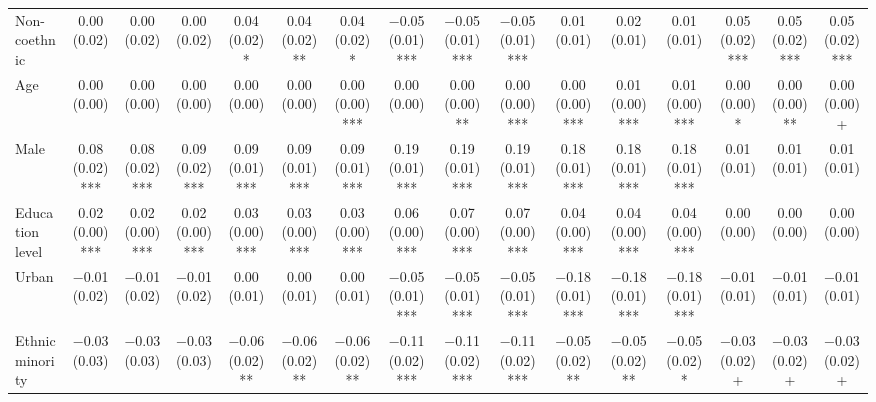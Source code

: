 \begin{table}
\begin{tabular}[t]{lccccccccccccccc}
Non-coethnic & \num{0.00} (\num{0.02}) & \num{0.00} (\num{0.02}) & \num{0.00} (\num{0.02}) & \num{0.04} (\num{0.02})* & \num{0.04} (\num{0.02})** & \num{0.04} (\num{0.02})* & \num{-0.05} (\num{0.01})*** & \num{-0.05} (\num{0.01})*** & \num{-0.05} (\num{0.01})*** & \num{0.01} (\num{0.01}) & \num{0.02} (\num{0.01}) & \num{0.01} (\num{0.01}) & \num{0.05} (\num{0.02})*** & \num{0.05} (\num{0.02})*** & \num{0.05} (\num{0.02})***\\
Age & \num{0.00} (\num{0.00}) & \num{0.00} (\num{0.00}) & \num{0.00} (\num{0.00}) & \num{0.00} (\num{0.00}) & \num{0.00} (\num{0.00}) & \num{0.00} (\num{0.00})*** & \num{0.00} (\num{0.00}) & \num{0.00} (\num{0.00})** & \num{0.00} (\num{0.00})*** & \num{0.00} (\num{0.00})*** & \num{0.01} (\num{0.00})*** & \num{0.01} (\num{0.00})*** & \num{0.00} (\num{0.00})* & \num{0.00} (\num{0.00})** & \num{0.00} (\num{0.00})+\\
Male & \num{0.08} (\num{0.02})*** & \num{0.08} (\num{0.02})*** & \num{0.09} (\num{0.02})*** & \num{0.09} (\num{0.01})*** & \num{0.09} (\num{0.01})*** & \num{0.09} (\num{0.01})*** & \num{0.19} (\num{0.01})*** & \num{0.19} (\num{0.01})*** & \num{0.19} (\num{0.01})*** & \num{0.18} (\num{0.01})*** & \num{0.18} (\num{0.01})*** & \num{0.18} (\num{0.01})*** & \num{0.01} (\num{0.01}) & \num{0.01} (\num{0.01}) & \num{0.01} (\num{0.01})\\
Education level & \num{0.02} (\num{0.00})*** & \num{0.02} (\num{0.00})*** & \num{0.02} (\num{0.00})*** & \num{0.03} (\num{0.00})*** & \num{0.03} (\num{0.00})*** & \num{0.03} (\num{0.00})*** & \num{0.06} (\num{0.00})*** & \num{0.07} (\num{0.00})*** & \num{0.07} (\num{0.00})*** & \num{0.04} (\num{0.00})*** & \num{0.04} (\num{0.00})*** & \num{0.04} (\num{0.00})*** & \num{0.00} (\num{0.00}) & \num{0.00} (\num{0.00}) & \num{0.00} (\num{0.00})\\
Urban & \num{-0.01} (\num{0.02}) & \num{-0.01} (\num{0.02}) & \num{-0.01} (\num{0.02}) & \num{0.00} (\num{0.01}) & \num{0.00} (\num{0.01}) & \num{0.00} (\num{0.01}) & \num{-0.05} (\num{0.01})*** & \num{-0.05} (\num{0.01})*** & \num{-0.05} (\num{0.01})*** & \num{-0.18} (\num{0.01})*** & \num{-0.18} (\num{0.01})*** & \num{-0.18} (\num{0.01})*** & \num{-0.01} (\num{0.01}) & \num{-0.01} (\num{0.01}) & \num{-0.01} (\num{0.01})\\
Ethnic minority & \num{-0.03} (\num{0.03}) & \num{-0.03} (\num{0.03}) & \num{-0.03} (\num{0.03}) & \num{-0.06} (\num{0.02})** & \num{-0.06} (\num{0.02})** & \num{-0.06} (\num{0.02})** & \num{-0.11} (\num{0.02})*** & \num{-0.11} (\num{0.02})*** & \num{-0.11} (\num{0.02})*** & \num{-0.05} (\num{0.02})** & \num{-0.05} (\num{0.02})** & \num{-0.05} (\num{0.02})* & \num{-0.03} (\num{0.02})+ & \num{-0.03} (\num{0.02})+ & \num{-0.03} (\num{0.02})+\\

\end{tabular}
\end{table}
